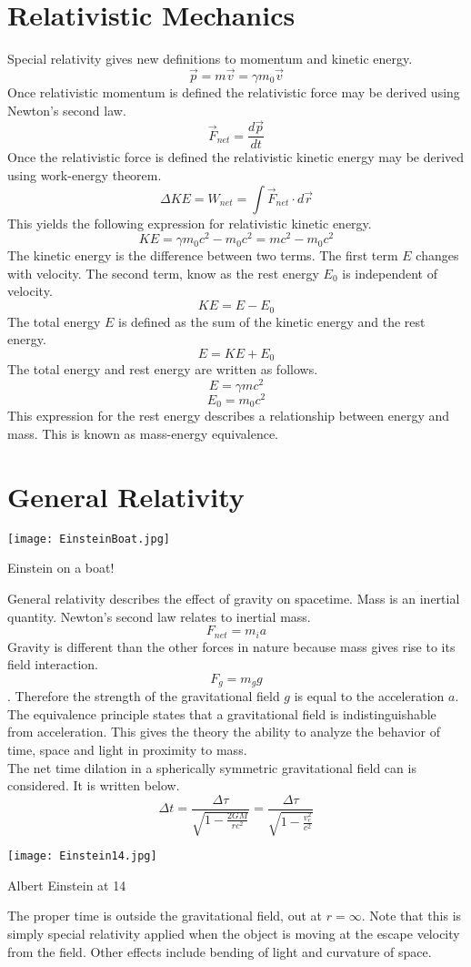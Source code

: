 \section{Relativistic Mechanics}
Special relativity gives new definitions to momentum and kinetic energy.
$$\overrightarrow{p}=m \overrightarrow{v}=\gamma m_0 \overrightarrow{v}$$
Once relativistic momentum is defined the relativistic force may be derived using Newton's second law.
$$\overrightarrow{F}_{net}=\frac{d\overrightarrow{p}}{dt}$$
Once the relativistic force is defined the relativistic kinetic energy may be derived using work-energy theorem.
$$\Delta KE=W_{net}= \int \overrightarrow{F}_{net}\cdot d\overrightarrow{r}$$
This yields the following expression for relativistic kinetic energy.
$$KE=\gamma m_0c^2-m_0c^2= m c^2-m_0c^2$$
The kinetic energy is the difference between two terms.  The first term $E$ changes with velocity.  The second term, know as the rest energy $E_0$ is independent of velocity.
$$KE=E-E_0$$
The total energy $E$ is defined as the sum of the kinetic energy and the rest energy.
$$E=KE+E_0$$
The total energy and rest energy are written as follows.
$$E=\gamma mc^2$$
$$E_0=m_0c^2$$
This expression for the rest energy describes a relationship between energy and mass.  This is known as mass-energy equivalence.

\section{General Relativity}
\begin{marginfigure}[0pt]
  \texttt{[image: EinsteinBoat.jpg]}
  \caption{Einstein on a boat!}
  \label{fig:marginfig}
\end{marginfigure}
General relativity describes the effect of gravity on spacetime.  Mass is an inertial quantity.  Newton's second law relates to inertial mass.  
$$F_{net}=m_{i}a$$ 
Gravity is different than the other forces in nature because mass gives rise to its field interaction.
$$F_g=m_gg$$.  
Therefore the strength of the gravitational field $g$ is equal to the acceleration $a$.  The equivalence principle states that a gravitational field is indistinguishable from acceleration.  This gives the theory the ability to analyze the behavior of time, space and light in proximity to mass.\\
The net time dilation in a spherically symmetric gravitational field can is considered. It is written below.
$$\Delta t=\frac{\Delta \tau}{\sqrt{1-\frac{2GM}{rc^2}}}=\frac{\Delta \tau}{\sqrt{1-\frac{v_e^2}{c^2}}}$$
\begin{marginfigure}[-60pt]
  \texttt{[image: Einstein14.jpg]}
  \caption{Albert Einstein at 14}
  \label{fig:marginfig}
\end{marginfigure}
The proper time is outside the gravitational field, out at $r=\infty$.  Note that this is simply special relativity applied when the object is moving at the escape velocity from the field.
Other effects include bending of light and curvature of space.
